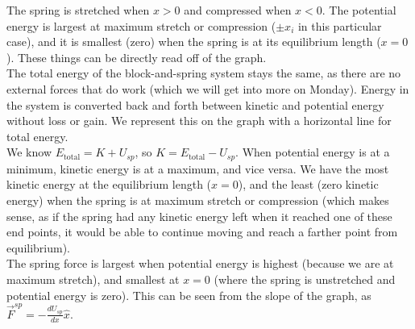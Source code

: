 \documentclass[]{article}
\begin{document}
\begin{TeacherMargin}
\begin{center}
\end{center}
The spring is stretched when $x>0$ and compressed when $x<0$. The potential energy is largest at maximum stretch or compression ($\pm x_{i}$ in this particular case), and it is smallest (zero) when the spring is at its equilibrium length ($x=0$). These things can be directly read off of the graph. \\

\noindent The total energy of the block-and-spring system stays the same, as there are no external forces that do work (which we will get into more on Monday). Energy in the system is converted back and forth between kinetic and potential energy without loss or gain. We represent this on the graph with a horizontal line for total energy. \\

\noindent We know $E_{\text{total}} = K+U_{sp}$, so $K = E_{\text{total}}-U_{sp}$. When potential energy is at a minimum, kinetic energy is at a maximum, and vice versa. We have the most kinetic energy at the equilibrium length ($x=0$), and the least (zero kinetic energy) when the spring is at maximum stretch or compression (which makes sense, as if the spring had any kinetic energy left when it reached one of these end points, it would be able to continue moving and reach a farther point from equilibrium). \\

\noindent The spring force is largest when potential energy is highest (because we are at maximum stretch), and smallest at $x=0$ (where the spring is unstretched and potential energy is zero). This can be seen from the slope of the graph, as $\vec{F}^{sp} = -\frac{dU_{sp}}{dx}\hat{x}$.
\end{TeacherMargin}
\end{document}

